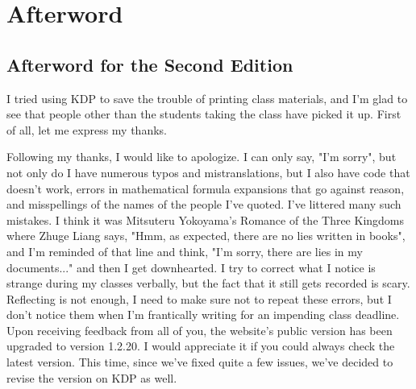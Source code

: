 \chapter*{Afterword}
\section*{Afterword for the Second Edition}

I tried using KDP to save the trouble of printing class materials, and I'm glad to see that people other than the students taking the class have picked it up. First of all, let me express my thanks.

Following my thanks, I would like to apologize.
I can only say, "I'm sorry", but not only do I have numerous typos and mistranslations, but I also have code that doesn't work, errors in mathematical formula expansions that go against reason, and misspellings of the names of the people I've quoted. I've littered many such mistakes. I think it was Mitsuteru Yokoyama's Romance of the Three Kingdoms where Zhuge Liang says, "Hmm, as expected, there are no lies written in books", and I'm reminded of that line and think, "I'm sorry, there are lies in my documents..." and then I get downhearted. I try to correct what I notice is strange during my classes verbally, but the fact that it still gets recorded is scary. Reflecting is not enough, I need to make sure not to repeat these errors, but I don't notice them when I'm frantically writing for an impending class deadline.
Upon receiving feedback from all of you, the website's public version has been upgraded to version 1.2.20. I would appreciate it if you could always check the latest version. This time, since we've fixed quite a few issues, we've decided to revise the version on KDP as well.

